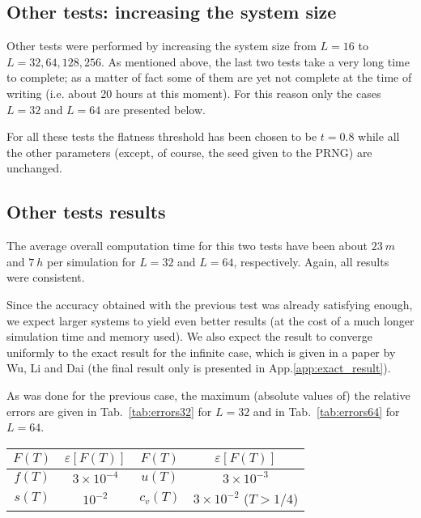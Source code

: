 \documentclass[11pt]{article}
\newcommand{\tabname}{Tab.~}
\newcommand{\appname}{App.}
\begin{document}
\subsection*{Other tests: increasing the system size}

Other tests were performed by increasing the system size from $L=16$ to $L={32,64,128,256}$. As mentioned above, the last two tests take a very long time to complete; as a matter of fact some of them are yet not complete at the time of writing (i.e. about 20 hours at this moment). For this reason only the cases $L=32$ and $L=64$ are presented below.

For all these tests the flatness threshold has been chosen to be $t=0.8$ while all the other parameters (except, of course, the seed given to the PRNG) are unchanged.


\subsection*{Other tests results}

The average overall computation time for this two tests have been about $23~m$ and $7~h$  per simulation for $L=32$ and $L=64$, respectively. Again, all results were consistent.

Since the accuracy obtained with the previous test was already satisfying enough, we expect larger systems to yield even better results (at the cost of a much longer simulation time and memory used). We also expect the result to converge uniformly to the exact result for the infinite case, which is given in a paper by Wu, Li and Dai\cite{bib:exact2} (the final result only is presented in \appname \ref{app:exact_result}).

As was done for the previous case, the maximum (absolute values of) the relative errors are given in \tabname \ref{tab:errors32} for $L=32$ and in \tabname \ref{tab:errors64} for $L=64$.

\begin{center}
\label{tab:errors32}
\begin{tabular}{cccc}
\toprule
$F(T)$	&	$\varepsilon[F(T)]$	&	$F(T)$		&	$\varepsilon[F(T)]$				\\
\midrule
$f(T)$	&	$3 \times 10^{-4}$	&	$u(T)$		&	$3 \times 10^{-3}$						\\
$s(T)$	&	$10^{-2}$			&	$c_v(T)$	&	$3 \times 10^{-2}$ ($T > 1/4$)		\\
\bottomrule
\end{tabular}
\end{center}
\end{document}

